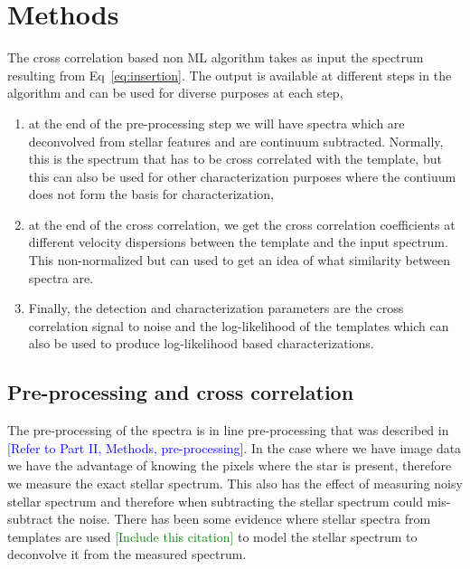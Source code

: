 \section{Methods}
The cross correlation based non ML algorithm takes as input the spectrum resulting from Eq~\ref{eq:insertion}.
The output is available at different steps in the algorithm and can be used for diverse purposes at each step,
\begin{enumerate}
    \item at the end of the pre-processing step we will have spectra which are deconvolved from stellar features and are continuum subtracted. Normally, this is the spectrum that has to be cross correlated with the template, but this can also be used for other characterization purposes where the contiuum does not form the basis for characterization,
    \item at the end of the cross correlation, we get the cross correlation coefficients at different velocity dispersions between the template and the input spectrum. 
    This non-normalized but can used to get an idea of what similarity between spectra are.
    \item Finally, the detection and characterization parameters are the cross correlation signal to noise and the log-likelihood of the templates which can also be used to produce log-likelihood based characterizations.
\end{enumerate}
\subsection{Pre-processing and cross correlation}
The pre-processing of the spectra is in line pre-processing that was described in \textcolor{blue}{[Refer to Part II, Methods, pre-processing]}.
In the case where we have image data we have the advantage of knowing the pixels where the star is present, therefore we measure the exact stellar spectrum.
This also has the effect of measuring noisy stellar spectrum and therefore when subtracting the stellar spectrum could mis-subtract the noise.
There has been some evidence where stellar spectra from templates are used \textcolor{green}{[Include this citation]} to model the stellar spectrum to deconvolve it from the measured spectrum.


